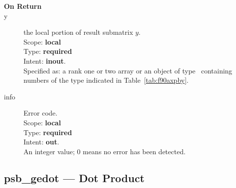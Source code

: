 \begin{description}

\end{description}

\begin{description}
\item[\bf On Return]
\item[y] the local portion of result submatrix $y$.\\
Scope: {\bf local} \\
Type: {\bf required} \\
Intent: {\bf inout}.\\
Specified as: a rank one or two array or an object of type \vdata\ containing numbers of the type
indicated in Table~\ref{tab:f90axpby}.
\item[info] Error code.\\
Scope: {\bf local} \\
Type: {\bf required} \\
Intent: {\bf out}.\\
An integer value; 0 means no error has been detected.
\end{description}

%
%

\clearpage\subsection{psb\_gedot --- Dot Product}

